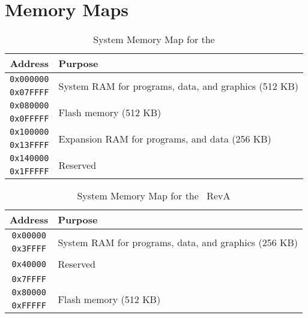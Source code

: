 \chapter{Memory Maps}

\begin{table}[ht]
    \begin{center}
        \begin{tabular}{|c|l|} \hline
            Address & Purpose \\ \hline\hline
            \verb+0x000000+ & \multirow{2}{*}{System RAM for programs, data, and graphics (512 KB)} \\ \cline{1-1}
            \verb+0x07FFFF+ & \\ \hline
            \verb+0x080000+ & \multirow{2}{*}{Flash memory (512 KB)} \\ \cline{1-1}
            \verb+0x0FFFFF+ & \\ \hline
            \verb+0x100000+ & \multirow{2}{*}{Expansion RAM for programs, and data (256 KB)} \\ \cline{1-1}
            \verb+0x13FFFF+ & \\ \hline
            \verb+0x140000+ & \multirow{2}{*}{Reserved} \\ \cline{1-1}
            \verb+0x1FFFFF+ & \\ \hline
        \end{tabular}
    \end{center}
    \caption{System Memory Map for the \jr}
    \label{tab:sys_mem_map}
\end{table}

\begin{table}[ht]
    \begin{center}
        \begin{tabular}{|c|l|} \hline
            Address & Purpose \\ \hline\hline
            \verb+0x00000+ & \multirow{2}{*}{System RAM for programs, data, and graphics (256 KB)} \\ \cline{1-1}
            \verb+0x3FFFF+ & \\ \hline
            \verb+0x40000+ & Reserved \\ \cline{1-1}
            \verb+0x7FFFF+ & \\ \hline
            \verb+0x80000+ & \multirow{2}{*}{Flash memory (512 KB)} \\ \cline{1-1}
            \verb+0xFFFFF+ & \\ \hline
        \end{tabular}
    \end{center}
    \caption{System Memory Map for the \jr\ RevA}
    \label{tab:sys_mem_map_reva}
\end{table}


